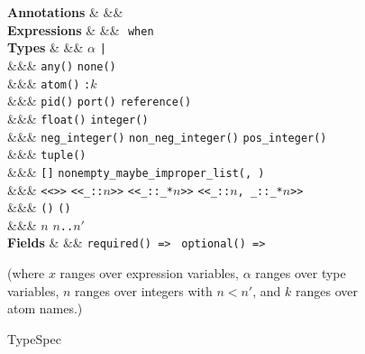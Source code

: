\begin{figure} [H]
   \begin{grammarfig}
      \textbf{Annotations} & \FWA &\bnfeq& 
      \TSAn 
      \\
      \textbf{Expressions} & \TSE &\bnfeq& 
      \TSFn{\ov{\TST}}{\TST} \bnfor 
      \TSFn{\ov{\TST}}{\TST}\,\,\texttt{when}\,\,\ov{\texttt{$\alpha$:}\,\TST}
      \\[2mm]
      \textbf{Types} & \TST &\bnfeq&
      \texttt{$\alpha$} \bnfor \texttt{\TST|\TST} 
      \\ &&\bnfor& \texttt{any()} \bnfor \texttt{none()}
      \\ &&\bnfor& \texttt{atom()} \bnfor \texttt{:$k$}
      \\ &&\bnfor& \texttt{pid()} \bnfor \texttt{port()} \bnfor \texttt{reference()}
      \\ &&\bnfor& \texttt{float()} \bnfor \texttt{integer()} 
      \\ &&\bnfor& \texttt{neg\_integer()} \bnfor \texttt{non\_neg\_integer()} \bnfor \texttt{pos\_integer()}
      \\ &&\bnfor& \texttt{tuple()} \bnfor \tuple{\ov{\TST}} \bnfor \map{\ov{\TSF}} 
      \\ &&\bnfor& \texttt{[]} \bnfor \texttt{nonempty\_maybe\_improper\_list(\TST, \TST)} 
      \\ &&\bnfor& \texttt{<<>>} \bnfor \texttt{<<\_::$n$>>} \bnfor \texttt{<<\_::\_*$n$>>} \bnfor \texttt{<<\_::$n$, \_::\_*$n$>>}
      \\ &&\bnfor& \texttt{(\fun{$\ov{\TST}$}{\TST})} \bnfor \texttt{()}
      \\ &&\bnfor& \texttt{$n$} \bnfor \texttt{$n$..$n'$}
      \\
      \textbf{Fields} & \TSF &\bnfeq&
      \texttt{required(\TST)\,=>\,\TST} \bnfor \texttt{optional(\TST)\,=>\,\TST}
      \end{grammarfig}
   \small(where $x$ ranges over expression variables, $\alpha$ ranges over type variables, 
   $n$ ranges over integers with $n<n'$, and $k$ ranges over atom names.)
   \caption{TypeSpec}
   \label{app:typespec-syntax}
\end{figure}